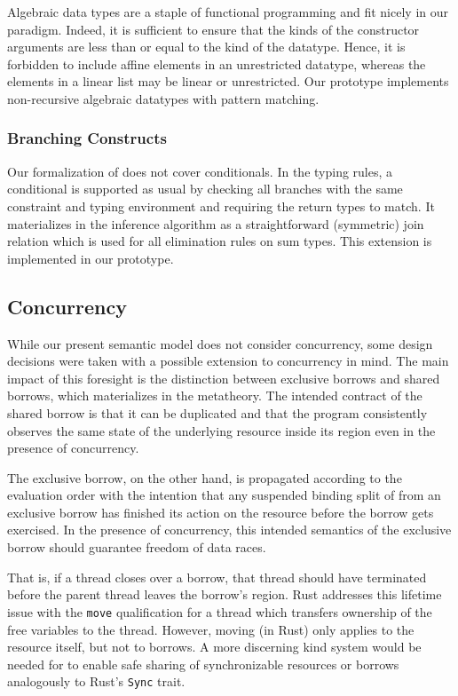 Algebraic data types are a staple of functional programming and fit nicely
in our paradigm. Indeed, it is sufficient to ensure  that the kinds of
the constructor arguments are less than or equal to the kind of the datatype.
Hence, it is forbidden to include affine elements in an unrestricted
datatype, whereas the elements in a linear list may be linear or
unrestricted.
Our prototype implements non-recursive algebraic datatypes with
pattern matching.

\subsubsection*{Branching Constructs}

Our formalization of \lang does not cover conditionals. In the
typing rules, a conditional is supported as usual by checking all
branches with the same constraint and typing environment and requiring
the return types to match.
It materializes in the inference algorithm as a straightforward
(symmetric) join relation which is used for all elimination rules on
sum types.
This extension is implemented in our prototype.

\subsection{Concurrency}
\label{sec:concurrency}

While our present semantic model does not consider concurrency, some
design decisions were taken with a possible extension to concurrency
in mind. The main impact of this foresight is the distinction between
exclusive borrows and shared borrows, which materializes in the
metatheory. The intended contract of the shared 
borrow is that it can be duplicated and that the program consistently
observes the same state of the underlying resource inside its region
even in the presence of concurrency.

The exclusive borrow, on the other hand, is propagated according to
the evaluation order with the intention that any suspended binding
split of from an exclusive borrow has finished its action on the
resource before the borrow gets exercised. In the presence of
concurrency, this intended semantics of the exclusive borrow should
guarantee freedom of data races.

That is, if a thread closes over a borrow, that thread should have
terminated before the parent thread leaves the borrow's region. Rust
addresses this lifetime issue with the \lstinline/move/ qualification
for a thread which transfers ownership of the free variables to the
thread. However, moving (in Rust) only applies to the resource itself, but not
to borrows. A more discerning kind system would be needed for \lang to
enable safe sharing of synchronizable resources or borrows analogously
to Rust's \texttt{Sync} trait.

\lstDeleteShortInline@

